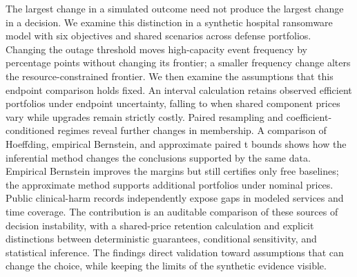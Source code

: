 The largest change in a simulated outcome need not produce the largest change
in a decision. We examine this distinction in a synthetic hospital ransomware
model with six objectives and shared scenarios across defense portfolios.
Changing the outage threshold moves high-capacity event frequency by
\HighGap{} percentage points without changing its frontier; a smaller
frequency change alters the resource-constrained frontier. We then examine
the assumptions that this endpoint comparison holds fixed. An interval
calculation retains \CertGuaranteedTotal{} observed efficient portfolios
under endpoint uncertainty, falling to \JointRetainedFloored{} when shared
component prices vary while upgrades remain strictly costly. Paired resampling
and coefficient-conditioned regimes reveal further changes in membership.
A comparison of Hoeffding, empirical Bernstein, and approximate paired t
bounds shows how the inferential method changes the conclusions supported
by the same data. Empirical Bernstein improves the margins but still
certifies only free baselines; the approximate method supports additional
portfolios under nominal prices. Public clinical-harm records independently
expose gaps in modeled services and time coverage. The contribution is an
auditable comparison of these sources of decision instability, with a
shared-price retention calculation and explicit distinctions between
deterministic guarantees, conditional sensitivity, and statistical inference.
The findings direct validation toward assumptions that can change the choice,
while keeping the limits of the synthetic evidence visible.
